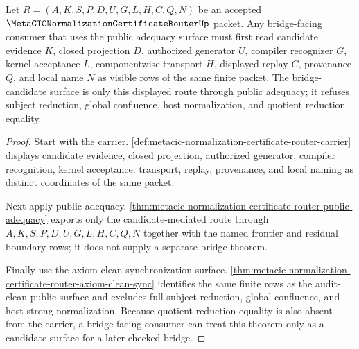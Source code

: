\begin{theorem}
\label{thm:metacic-normalization-router-bridge-candidate-surface}
Let $R=(A,K,S,P,D,U,G,L,H,C,Q,N)$ be an accepted $\MetaCICNormalizationCertificateRouterUp$ packet. Any bridge-facing consumer that uses the public adequacy surface must first read candidate evidence $K$, closed projection $D$, authorized generator $U$, compiler recognizer $G$, kernel acceptance $L$, componentwise transport $H$, displayed replay $C$, provenance $Q$, and local name $N$ as visible rows of the same finite packet. The bridge-candidate surface is only this displayed route through public adequacy; it refuses subject reduction, global confluence, host normalization, and quotient reduction equality.
\end{theorem}
\begin{proof}
Start with the carrier. \autoref{def:metacic-normalization-certificate-router-carrier} displays candidate evidence, closed projection, authorized generator, compiler recognition, kernel acceptance, transport, replay, provenance, and local naming as distinct coordinates of the same packet.

Next apply public adequacy. \autoref{thm:metacic-normalization-certificate-router-public-adequacy} exports only the candidate-mediated route through $A,K,S,P,D,U,G,L,H,C,Q,N$ together with the named frontier and residual boundary rows; it does not supply a separate bridge theorem.

Finally use the axiom-clean synchronization surface. \autoref{thm:metacic-normalization-certificate-router-axiom-clean-sync} identifies the same finite rows as the audit-clean public surface and excludes full subject reduction, global confluence, and host strong normalization. Because quotient reduction equality is also absent from the carrier, a bridge-facing consumer can treat this theorem only as a candidate surface for a later checked bridge.
\end{proof}

